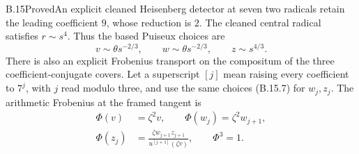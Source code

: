 \begin{statement}{B.15}{Proved}{An explicit cleaned Heisenberg detector at seven}
two radicals retain the leading coefficient $9$, whose
reduction is $2$.  The cleaned central radical satisfies
$r\sim s^4$.  Thus the based Puiseux choices are
\[
 v\sim\theta s^{-2/3},\qquad
 w\sim\theta s^{-2/3},\qquad
 z\sim s^{4/3}.                                            \tag{B.15.7}
\]
There is also an explicit Frobenius transport on the
compositum of the three coefficient-conjugate covers.
Let a superscript $[j]$ mean raising every coefficient
to $7^j$, with $j$ read modulo three, and use the same
choices (B.15.7) for $w_j,z_j$.  The arithmetic
Frobenius at the framed tangent is
\[
 \begin{split}
 \Phi(v)&=\zeta^2v,\qquad
 \Phi(w_j)=\zeta^2w_{j+1},\\
 \Phi(z_j)&=
       \frac{\zeta w_{j+1}z_{j+1}}
                    {u^{[j+1]}(\zeta v)},\qquad
 \Phi^3=1 .
 \end{split}                                               \tag{B.15.15}
\]
\end{statement}
